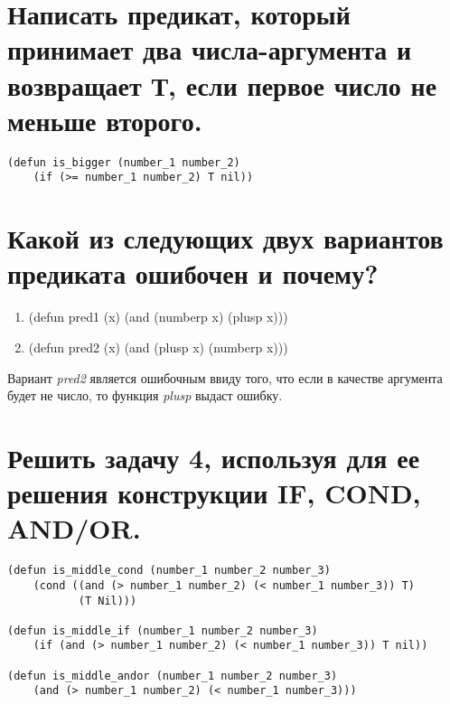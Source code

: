 \section{Написать предикат, который принимает два числа-аргумента и возвращает Т, если первое число не меньше второго.}
\begin{lstlisting}[caption=Задание 6]
(defun is_bigger (number_1 number_2)
	(if (>= number_1 number_2) T nil))
\end{lstlisting}

\section{Какой из следующих двух вариантов предиката ошибочен и почему?}
\begin{enumerate}
	\item (defun pred1 (x) (and (numberp x) (plusp x)))
	
	\item (defun pred2 (x) (and (plusp x) (numberp x)))
\end{enumerate}

Вариант \textit{pred2} является ошибочным ввиду того, что если в качестве аргумента будет не число, то функция \textit{plusp} выдаст ошибку. 

\section{Решить задачу 4, используя для ее решения конструкции IF, COND, AND/OR.}
\begin{lstlisting}[caption=Задание 8]
(defun is_middle_cond (number_1 number_2 number_3)
	(cond ((and (> number_1 number_2) (< number_1 number_3)) T) 
		   (T Nil)))
	
(defun is_middle_if (number_1 number_2 number_3)
	(if (and (> number_1 number_2) (< number_1 number_3)) T nil))
	
(defun is_middle_andor (number_1 number_2 number_3)
	(and (> number_1 number_2) (< number_1 number_3)))
\end{lstlisting}

\newpage
